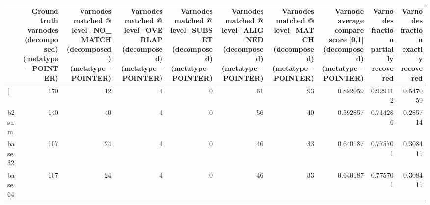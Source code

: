 \begin{tabular}{lrrrrrrrrr}
\toprule
{} &  Ground truth varnodes (decomposed) (metatype=POINTER) &  Varnodes matched @ level=NO\_MATCH (decomposed) (metatype=POINTER) &  Varnodes matched @ level=OVERLAP (decomposed) (metatype=POINTER) &  Varnodes matched @ level=SUBSET (decomposed) (metatype=POINTER) &  Varnodes matched @ level=ALIGNED (decomposed) (metatype=POINTER) &  Varnodes matched @ level=MATCH (decomposed) (metatype=POINTER) &  Varnode average compare score [0,1] (decomposed) (metatype=POINTER) &  Varnodes fraction partially recovered &  Varnodes fraction exactly recovered \\
\midrule
[         &                                                170 &                                                 12 &                                                  4 &                                                  0 &                                                 61 &                                                 93 &                                           0.822059 &                               0.929412 &                             0.547059 \\
b2sum     &                                                140 &                                                 40 &                                                  4 &                                                  0 &                                                 56 &                                                 40 &                                           0.592857 &                               0.714286 &                             0.285714 \\
base32    &                                                107 &                                                 24 &                                                  4 &                                                  0 &                                                 46 &                                                 33 &                                           0.640187 &                               0.775701 &                             0.308411 \\
base64    &                                                107 &                                                 24 &                                                  4 &                                                  0 &                                                 46 &                                                 33 &                                           0.640187 &                               0.775701 &                             0.308411 \\

\end{tabular}
